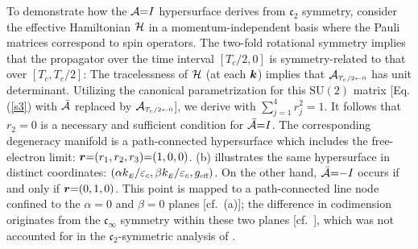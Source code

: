 \documentclass[aps, prb, showpacs, twocolumn, notitlepage, superscriptaddress]{revtex4-1}
\begin{document}
To demonstrate how the ${\cal A}{=}I$ hypersurface derives from $\mathfrak{c}_2$ symmetry, consider  the effective Hamiltonian ${\cal H}$ 
in a momentum-independent basis where the Pauli matrices correspond to spin operators. The two-fold rotational symmetry 
implies that the propagator over the time interval $[T_c/2,0]$ is symmetry-related to that over $[T_c,T_c/2]$:
The tracelessness of ${\cal H}$ (at each $\boldsymbol{k}$) implies that  ${{\cal A}}_{\scriptscriptstyle{T_c/2\leftarrow 0}}$  has unit determinant. 
Utilizing the canonical parametrization for this $\text{SU}(2)$ matrix [Eq. (\ref{s3}) with ${\cal \bar{A}}$ replaced by ${{\cal A}}_{\scriptscriptstyle{T_c/2\leftarrow 0}}$], we derive 
with $\sum_{j=1}^4r_j^2{=}1$. It follows that $r_2{=}0$ is a necessary and sufficient condition for ${\cal \bar{A}}{=}I$. The corresponding degeneracy manifold is a  path-connected hypersurface which includes the free-electron limit: $\boldsymbol{r}{=}(r_1,r_2,r_3){=}(1,0,0)$. (b) illustrates the same hypersurface in distinct coordinates: $(\alpha k_{\scriptscriptstyle{E}}/\varepsilon_c,\beta k_{\scriptscriptstyle{E}}/\varepsilon_c,g_{\scriptscriptstyle{\text{eff}}})$. On the other hand, ${\cal \bar{A}}{=}{-}I$ occurs if and only if $\boldsymbol{r}{=}(0,1,0)$. This point is mapped to a path-connected line node confined to the  $\alpha{=}0$ and $\beta{=}0$ planes [cf.\ (a)]; the difference in codimension originates from the  $\mathfrak{c}_{\infty}$ symmetry within these two planes [cf.\ ], which was not accounted for in the $\mathfrak{c}_2$-symmetric analysis of . 

\end{document}

